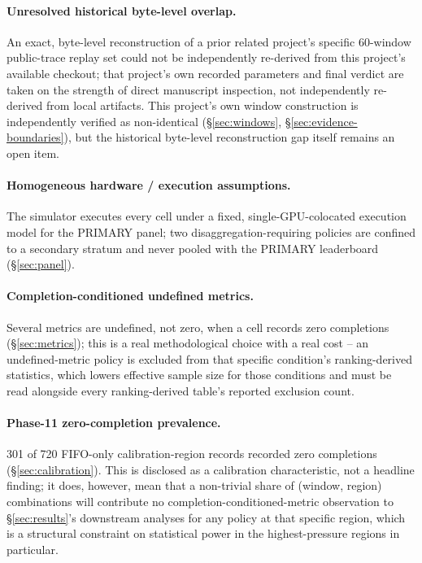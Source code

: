 \documentclass[sn-basic,Numbered,pdflatex]{sn-jnl}
\begin{document}
\paragraph{Unresolved historical byte-level overlap.} An exact,
byte-level reconstruction of a prior related project's specific 60-window
public-trace replay set could not be independently re-derived from this
project's available checkout; that project's own recorded parameters and
final verdict are taken on the strength of direct manuscript inspection,
not independently re-derived from local artifacts. This project's own
window construction is independently verified as non-identical
(\S\ref{sec:windows}, \S\ref{sec:evidence-boundaries}), but the historical
byte-level reconstruction gap itself remains an open item.

\paragraph{Homogeneous hardware / execution assumptions.} The simulator
executes every cell under a fixed, single-GPU-colocated execution model for
the PRIMARY panel; two disaggregation-requiring policies are confined to a
secondary stratum and never pooled with the PRIMARY leaderboard
(\S\ref{sec:panel}).

\paragraph{Completion-conditioned undefined metrics.} Several metrics are
undefined, not zero, when a cell records zero completions
(\S\ref{sec:metrics}); this is a real methodological choice with a
real cost -- an undefined-metric policy is excluded from that specific
condition's ranking-derived statistics, which lowers effective sample size
for those conditions and must be read alongside every ranking-derived
table's reported exclusion count.

\paragraph{Phase-11 zero-completion prevalence.} 301 of 720 FIFO-only
calibration-region records recorded zero completions
(\S\ref{sec:calibration}). This is disclosed as a calibration
characteristic, not a headline finding; it does, however, mean that a
non-trivial share of (window, region) combinations will contribute no
completion-conditioned-metric observation to \S\ref{sec:results}'s
downstream analyses for any policy at that specific region, which is a
structural constraint on statistical power in the highest-pressure regions
in particular.
\end{document}
